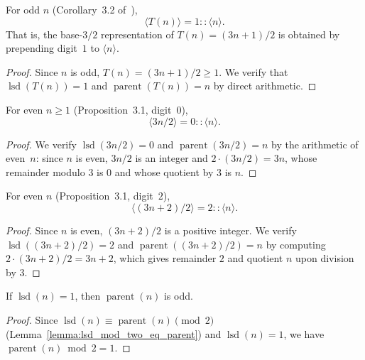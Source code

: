 
\begin{lemma}\label{lemma:digits32_T_odd}\leanok
For odd $n$ (Corollary~3.2 of~\cite{eli25}),
\[
  \langle T(n) \rangle = 1 :: \langle n \rangle.
\]
That is, the base-$3/2$ representation of $T(n) = (3n+1)/2$ is obtained by
prepending digit~$1$ to $\langle n \rangle$.
\end{lemma}
\begin{proof}\leanok
Since $n$ is odd, $T(n) = (3n+1)/2 \ge 1$.  We verify that
$\operatorname{lsd}(T(n)) = 1$ and $\operatorname{parent}(T(n)) = n$
by direct arithmetic.
\end{proof}

\begin{lemma}\label{lemma:digits32_extend_zero}\leanok
For even $n \ge 1$ (Proposition~3.1, digit~$0$),
\[
  \langle 3n/2 \rangle = 0 :: \langle n \rangle.
\]
\end{lemma}
\begin{proof}\leanok
We verify $\operatorname{lsd}(3n/2) = 0$ and $\operatorname{parent}(3n/2) = n$
by the arithmetic of even~$n$: since $n$ is even, $3n/2$ is an integer
and $2 \cdot (3n/2) = 3n$, whose remainder modulo $3$ is $0$ and
whose quotient by $3$ is $n$.
\end{proof}

\begin{lemma}\label{lemma:digits32_extend_two}\leanok
For even $n$ (Proposition~3.1, digit~$2$),
\[
  \langle (3n+2)/2 \rangle = 2 :: \langle n \rangle.
\]
\end{lemma}
\begin{proof}\leanok
Since $n$ is even, $(3n+2)/2$ is a positive integer.  We verify
$\operatorname{lsd}((3n+2)/2) = 2$ and $\operatorname{parent}((3n+2)/2) = n$
by computing $2 \cdot (3n+2)/2 = 3n + 2$, which gives remainder $2$
and quotient $n$ upon division by $3$.
\end{proof}

\begin{lemma}\label{lemma:odd_of_lsd_one}\leanok
If $\operatorname{lsd}(n) = 1$, then $\operatorname{parent}(n)$ is odd.
\end{lemma}
\begin{proof}\leanok
Since $\operatorname{lsd}(n) \equiv \operatorname{parent}(n) \pmod{2}$
(Lemma~\ref{lemma:lsd_mod_two_eq_parent}) and $\operatorname{lsd}(n) = 1$,
we have $\operatorname{parent}(n) \bmod 2 = 1$.
\end{proof}

